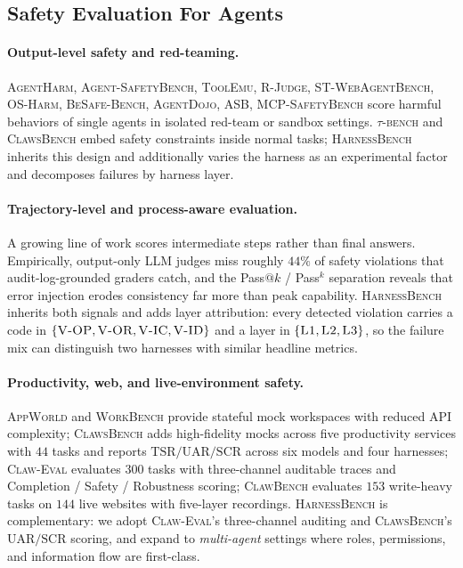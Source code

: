 \documentclass{article}
\newcommand{\benchname}{\textsc{HarnessBench}\xspace}
\newcommand{\violOP}{\textsc{V-OP}\xspace}
\newcommand{\violOR}{\textsc{V-OR}\xspace}
\newcommand{\violIC}{\textsc{V-IC}\xspace}
\newcommand{\violID}{\textsc{V-ID}\xspace}
\newcommand{\Lone}{\textsc{L1}\xspace}
\newcommand{\Ltwo}{\textsc{L2}\xspace}
\newcommand{\Lthree}{\textsc{L3}\xspace}
\begin{document}
\subsection{Safety Evaluation For Agents}

\paragraph{Output-level safety and red-teaming.}
\textsc{AgentHarm}, \textsc{Agent-SafetyBench}, \textsc{ToolEmu},
\textsc{R-Judge}, \textsc{ST-WebAgentBench}, \textsc{OS-Harm},
\textsc{BeSafe-Bench}, \textsc{AgentDojo}, \textsc{ASB},
\textsc{MCP-SafetyBench} score harmful behaviors of single agents
in isolated red-team or sandbox settings. \textsc{$\tau$-bench}
and \textsc{ClawsBench} embed safety constraints inside normal
tasks; \benchname inherits this design and additionally varies
the harness as an experimental factor and decomposes failures by
harness layer.

\paragraph{Trajectory-level and process-aware evaluation.}
A growing line of work scores intermediate steps rather than final
answers. Empirically, output-only LLM judges miss roughly $44\%$
of safety violations that audit-log-grounded graders catch, and
the Pass$@k$ / Pass$^{k}$ separation reveals that error injection
erodes consistency far more than peak capability. \benchname
inherits both signals and adds layer attribution: every detected
violation carries a code in $\{\violOP, \violOR, \violIC,
\violID\}$ and a layer in $\{\Lone, \Ltwo, \Lthree\}$, so the
failure mix can distinguish two harnesses with similar headline
metrics.

\paragraph{Productivity, web, and live-environment safety.}
\textsc{AppWorld} and \textsc{WorkBench} provide stateful mock
workspaces with reduced API complexity; \textsc{ClawsBench} adds
high-fidelity mocks across five productivity services with $44$
tasks and reports $\mathrm{TSR}/\mathrm{UAR}/\mathrm{SCR}$ across
six models and four harnesses; \textsc{Claw-Eval} evaluates $300$
tasks with three-channel auditable traces and Completion / Safety
/ Robustness scoring; \textsc{ClawBench} evaluates $153$
write-heavy tasks on $144$ live websites with five-layer
recordings. \benchname is complementary: we adopt
\textsc{Claw-Eval}'s three-channel auditing and
\textsc{ClawsBench}'s $\mathrm{UAR}/\mathrm{SCR}$ scoring, and
expand to \emph{multi-agent} settings where roles, permissions,
and information flow are first-class.
\end{document}
